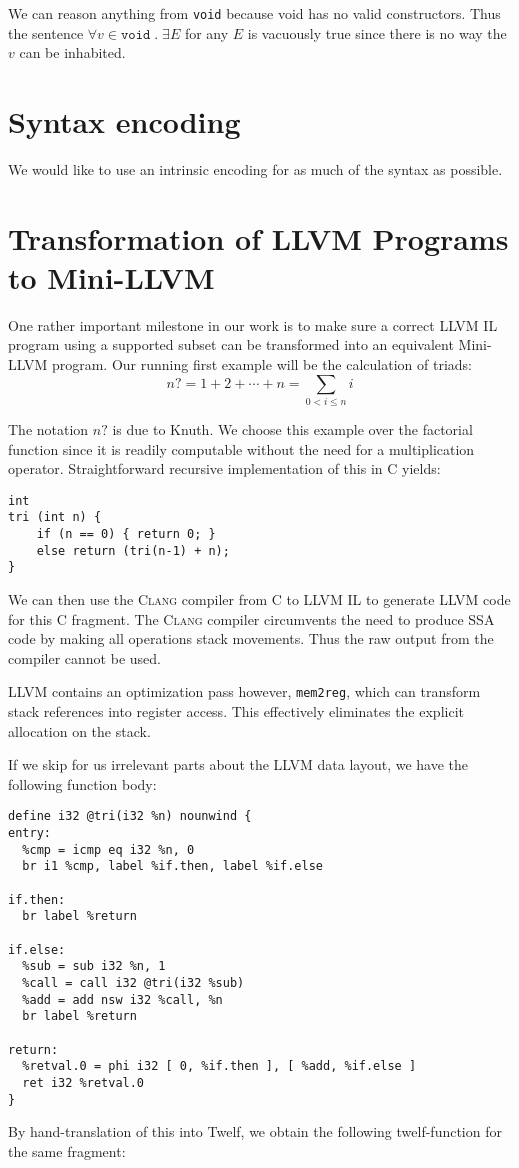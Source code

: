 \documentclass[a4paper, oneside, 10pt, draft]{memoir}
\newcommand{\clang}{\textsc{Clang}}
\begin{document}
We can reason anything from \texttt{void} because void has no valid
constructors. Thus the sentence $\forall v \in \texttt{void} \; . \; \exists
E$ for any $E$ is vacuously true since there is no way the $v$ can be
inhabited.

\section{Syntax encoding}

We would like to use an intrinsic encoding for as much of the syntax
as possible.

\section{Transformation of LLVM Programs to Mini-LLVM}

One rather important milestone in our work is to make sure a correct
LLVM IL program using a supported subset can be transformed into an
equivalent Mini-LLVM program. Our running first example will be the
calculation of triads:
\begin{equation}
  \label{eq:1}
  n? = 1 + 2 + \dotsb + n = \sum_{0 < i \leq n} i
\end{equation}

The notation $n?$ is due to Knuth\cite[section
1.2.5]{knuth:1997:taocp1}. We choose this example over the factorial
function since it is readily computable without the need for a
multiplication operator. Straightforward recursive implementation of
this in C yields:
\begin{verbatim}
int
tri (int n) {
    if (n == 0) { return 0; }
    else return (tri(n-1) + n);
}
\end{verbatim}
We can then use the \clang{} compiler from C to LLVM IL to
generate LLVM code for this C fragment. The \clang{} compiler
circumvents the need to produce SSA code by making all operations
stack movements. Thus the raw output from the compiler cannot be
used.

LLVM contains an optimization pass however, \texttt{mem2reg}, which
can transform stack references into register access. This effectively
eliminates the explicit allocation on the stack.

If we skip for us irrelevant parts about the LLVM data layout, we have
the following function body:
\begin{verbatim}
define i32 @tri(i32 %n) nounwind {
entry:
  %cmp = icmp eq i32 %n, 0
  br i1 %cmp, label %if.then, label %if.else

if.then:
  br label %return

if.else:
  %sub = sub i32 %n, 1
  %call = call i32 @tri(i32 %sub)
  %add = add nsw i32 %call, %n
  br label %return

return:
  %retval.0 = phi i32 [ 0, %if.then ], [ %add, %if.else ]
  ret i32 %retval.0
}
\end{verbatim}
By hand-translation of this into Twelf, we obtain the following
twelf-function for the same fragment:
\end{document}
